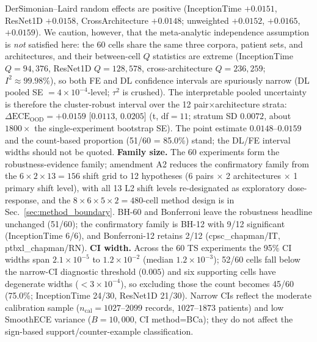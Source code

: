\documentclass[review,12pt,nonatbib]{elsarticle}
\begin{document}
DerSimonian--Laird random effects are positive (InceptionTime
$+0.0151$, ResNet1D $+0.0158$, CrossArchitecture $+0.0148$; unweighted
$+0.0152$, $+0.0165$, $+0.0159$). We caution, however, that the
meta-analytic independence assumption is \emph{not} satisfied here: the
60 cells share the same three corpora, patient sets, and architectures,
and their between-cell $Q$ statistics are extreme (InceptionTime
$Q=94{,}376$, ResNet1D $Q=128{,}578$, cross-architecture $Q=236{,}259$;
$I^2 \approx 99.98\%$), so both FE and DL confidence intervals are
spuriously narrow (DL pooled SE $=4\times10^{-4}$-level; $\tau^2$ is
crushed). The interpretable pooled uncertainty is therefore the
cluster-robust interval over the 12 pair$\times$architecture strata:
$\Delta\text{ECE}_{\text{OOD}} = +0.0159$ [$0.0113$, $0.0205$] (t,
df$=11$; stratum SD $0.0072$, about $1800\times$ the single-experiment
bootstrap SE). The point estimate $0.0148$--$0.0159$ and the
count-based proportion (51/60 = 85.0\%) stand; the DL/FE interval
widths should not be quoted.  \textbf{Family size.}
The 60 experiments form the robustness-evidence family; amendment A2
reduces the confirmatory family from the $6 \times 2 \times 13 = 156$
shift grid to 12 hypotheses (6 pairs $\times$ 2 architectures $\times$ 1
primary shift level), with all 13 L2 shift levels re-designated as
exploratory dose-response, and the $8 \times 6 \times 5 \times 2 = 480$-cell
method design is in Sec.~\ref{sec:method_boundary}. BH-60 and Bonferroni
leave the robustness headline unchanged (51/60); the confirmatory family
is BH-12 with 9/12 significant (InceptionTime 6/6), and Bonferroni-12
retains 2/12
(cpsc\_chapman/IT, ptbxl\_chapman/RN).  \textbf{CI width.} Across the 60 TS experiments the 95\% CI widths span
$2.1\times10^{-5}$ to $1.2\times10^{-2}$ (median $1.2\times10^{-3}$);
52/60 cells fall below the narrow-CI diagnostic threshold ($0.005$) and
six supporting cells have degenerate widths ($<3\times10^{-4}$), so
excluding those the count becomes 45/60 (75.0\%; InceptionTime 24/30,
ResNet1D 21/30). Narrow CIs reflect the moderate calibration sample
($n_{\text{cal}} = 1027$--$2099$ records, $1027$--$1873$ patients) and low
SmoothECE variance ($B=10{,}000$, CI method=BCa); they do not affect the
sign-based support/counter-example classification.

\end{document}
